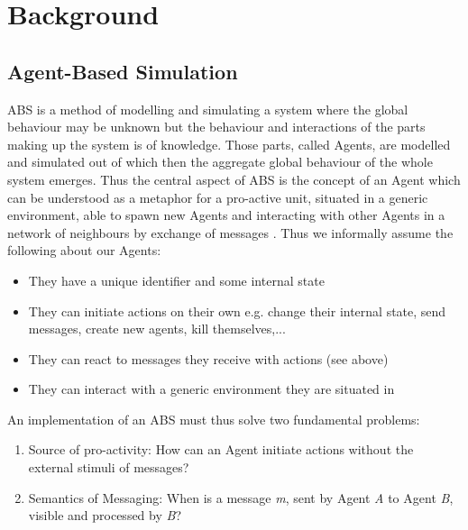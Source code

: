 \section{Background}

\subsection{Agent-Based Simulation}
ABS is a method of modelling and simulating a system where the global behaviour may be unknown but the behaviour and interactions of the parts making up the system is of knowledge. Those parts, called Agents, are modelled and simulated out of which then the aggregate global behaviour of the whole system emerges. Thus the central aspect of ABS is the concept of an Agent which can be understood as a metaphor for a pro-active unit, situated in a generic environment, able to spawn new Agents and interacting with other Agents in a network of neighbours by exchange of messages \cite{wooldridge_introduction_2009}. Thus we informally assume the following about our Agents:

\begin{itemize}
	\item They have a unique identifier and some internal state
	\item They can initiate actions on their own e.g. change their internal state, send messages, create new agents, kill themselves,...
	\item They can react to messages they receive with actions (see above)
	\item They can interact with a generic environment they are situated in
\end{itemize} 

An implementation of an ABS must thus solve two fundamental problems:

\begin{enumerate}
	\item Source of pro-activity: How can an Agent initiate actions without the external stimuli of messages?
	\item Semantics of Messaging: When is a message \textit{m}, sent by Agent \textit{A} to Agent \textit{B}, visible and processed by \textit{B}?
\end{enumerate}

